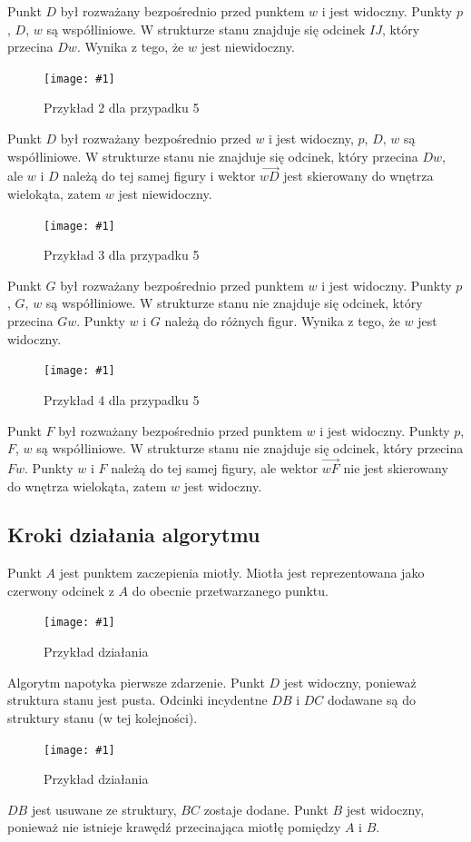 \documentclass[12pt]{article}
\newcommand{\imgcustomsize}[3]{
	\begin{figure}[H]
		\centering
		\texttt{[image: \#1]}
		\caption{#2}
		\label{#1}
	\end{figure}
}
\newcommand{\img}[2]{\imgcustomsize{#1}{#2}{0.5}}
\begin{document}
			Punkt $ D $ był rozważany bezpośrednio przed punktem $ w $ i jest widoczny. Punkty $ p $, $ D $, $ w $ są współliniowe. W strukturze stanu znajduje się odcinek $IJ$, który przecina $Dw$. Wynika z tego, że $ w $ jest niewidoczny.
			
			\img{przypadek5.2.jpg}{Przykład 2 dla przypadku 5}
			
			Punkt $ D $ był rozważany bezpośrednio przed $ w $ i jest widoczny, $ p $, $ D $, $ w $ są współliniowe. W strukturze stanu nie znajduje się odcinek, który przecina $Dw$, ale $ w $ i $ D $ należą do tej samej figury i wektor $ \overrightarrow{wD} $ jest skierowany do wnętrza wielokąta, zatem $ w $ jest niewidoczny.
			
			\img{przypadek5.3.jpg}{Przykład 3 dla przypadku 5}
			
			Punkt $ G $ był rozważany bezpośrednio przed punktem $ w $ i jest widoczny. Punkty $ p $, $ G $, $ w $ są współliniowe. W strukturze stanu nie znajduje się odcinek, który przecina $Gw$. Punkty $ w $ i $ G $ należą do różnych figur. Wynika z tego, że $ w $ jest widoczny.
			
			\img{przypadek5.4.jpg}{Przykład 4 dla przypadku 5}
			
			Punkt $ F $ był rozważany bezpośrednio przed punktem $ w $ i jest widoczny. Punkty $ p $, $ F $, $ w $ są współliniowe. W strukturze stanu nie znajduje się odcinek, który przecina $Fw$. Punkty $ w $ i $ F $ należą do tej samej figury, ale wektor $ \overrightarrow{wF} $ nie jest skierowany do wnętrza wielokąta, zatem $ w $ jest widoczny.
		
		\subsection{Kroki działania algorytmu} \label{sssec:steps}
			Punkt $ A $ jest punktem zaczepienia miotły. Miotła jest reprezentowana jako czerwony odcinek z $ A $ do obecnie przetwarzanego punktu.
			
			\imgcustomsize{visibility-step000-001.jpg}{Przykład działania}{0.35}
			Algorytm napotyka pierwsze zdarzenie.  Punkt $ D $ jest widoczny, ponieważ struktura stanu jest pusta. Odcinki incydentne $ DB $ i $ DC $ dodawane są do struktury stanu (w tej kolejności).
			
			\imgcustomsize{visibility-step000-002.jpg}{Przykład działania}{0.35}
			$ DB $ jest usuwane ze struktury, $ BC $ zostaje dodane. Punkt $ B $ jest widoczny, ponieważ nie istnieje krawędź przecinająca miotłę pomiędzy $ A $ i $ B $.
			
\end{document}
